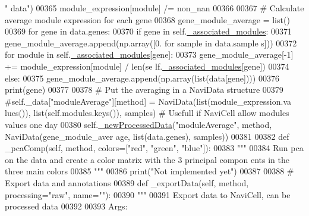 \begin{DoxyCode}
       \textcolor{stringliteral}{" data"})
00365             module\_expression[module] /= non\_nan
00366 
00367         \textcolor{comment}{# Calculate average module expression for each gene}
00368         gene\_module\_average = list()
00369         \textcolor{keywordflow}{for} gene \textcolor{keywordflow}{in} data.genes:
00370             \textcolor{keywordflow}{if} gene \textcolor{keywordflow}{in} self.\hyperlink{classnavicom_1_1navicom_1_1NaviCom_abc04e5310dba9a8c2dd2037281464727}{_associated_modules}:
00371                 gene\_module\_average.append(np.array([0. \textcolor{keywordflow}{for} sample \textcolor{keywordflow}{in} data.sample
      s]))
00372                 \textcolor{keywordflow}{for} module \textcolor{keywordflow}{in} self.\hyperlink{classnavicom_1_1navicom_1_1NaviCom_abc04e5310dba9a8c2dd2037281464727}{_associated_modules}[gene]:
00373                     gene\_module\_average[-1] += module\_expression[module] / len(se
      lf.\hyperlink{classnavicom_1_1navicom_1_1NaviCom_abc04e5310dba9a8c2dd2037281464727}{_associated_modules}[gene])
00374             \textcolor{keywordflow}{else}:
00375                 gene\_module\_average.append(np.array(list(data[gene])))
00376                 \textcolor{keywordflow}{print}(gene)
00377 
00378         \textcolor{comment}{# Put the averaging in a NaviData structure}
00379         \textcolor{comment}{#self.\_data["moduleAverage"][method] = NaviData(list(module\_expression.va
      lues()), list(self.modules.keys()), samples) # Usefull if NaviCell allow modules 
      values one day}
00380         self.\hyperlink{classnavicom_1_1navicom_1_1NaviCom_acf8b9094fa76cafefb910daeb68b7e5d}{_newProcessedData}(\textcolor{stringliteral}{"moduleAverage"}, method, NaviData(gene\_module\_aver
      age, list(data.genes), samples))
00381 
00382     \textcolor{keyword}{def }\_pcaComp(self, method, colors=["red", "green", "blue"]):
00383         \textcolor{stringliteral}{"""}
00384 \textcolor{stringliteral}{        Run pca on the data and create a color matrix with the 3 principal compon
      ents in the three main colors}
00385 \textcolor{stringliteral}{        """}
00386         \textcolor{keywordflow}{print}(\textcolor{stringliteral}{"Not implemented yet"})
00387 
00388     \textcolor{comment}{# Export data and annotations}
00389     \textcolor{keyword}{def }\_exportData(self, method, processing="raw", name=""):
00390         \textcolor{stringliteral}{"""}
00391 \textcolor{stringliteral}{        Export data to NaviCell, can be processed data}
00392 \textcolor{stringliteral}{}
00393 \textcolor{stringliteral}{        Args:}

\end{DoxyCode}
